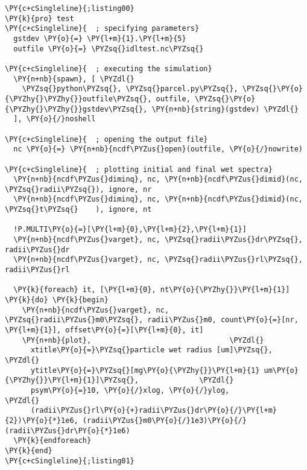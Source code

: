 \begin{Verbatim}[commandchars=\\\{\}]
\PY{c+cSingleline}{;listing00}
\PY{k}{pro} test 
\PY{c+cSingleline}{  ; specifying parameters}
  gstdev \PY{o}{=} \PY{l+m}{1}.\PY{l+m}{5}
  outfile \PY{o}{=} \PYZsq{}idltest.nc\PYZsq{}

\PY{c+cSingleline}{  ; executing the simulation}
  \PY{n+nb}{spawn}, [ \PYZdl{}
    \PYZsq{}python\PYZsq{}, \PYZsq{}parcel.py\PYZsq{}, \PYZsq{}\PY{o}{\PYZhy{}\PYZhy{}}outfile\PYZsq{}, outfile, \PYZsq{}\PY{o}{\PYZhy{}\PYZhy{}}gstdev\PYZsq{}, \PY{n+nb}{string}(gstdev) \PYZdl{}
  ], \PY{o}{/}noshell

\PY{c+cSingleline}{  ; opening the output file}
  nc \PY{o}{=} \PY{n+nb}{ncdf\PYZus{}open}(outfile, \PY{o}{/}nowrite)

\PY{c+cSingleline}{  ; plotting initial and final wet spectra}
  \PY{n+nb}{ncdf\PYZus{}diminq}, nc, \PY{n+nb}{ncdf\PYZus{}dimid}(nc, \PYZsq{}radii\PYZsq{}), ignore, nr
  \PY{n+nb}{ncdf\PYZus{}diminq}, nc, \PY{n+nb}{ncdf\PYZus{}dimid}(nc, \PYZsq{}t\PYZsq{}    ), ignore, nt

  !P.MULTI\PY{o}{=}[\PY{l+m}{0},\PY{l+m}{2},\PY{l+m}{1}]
  \PY{n+nb}{ncdf\PYZus{}varget}, nc, \PYZsq{}radii\PYZus{}dr\PYZsq{}, radii\PYZus{}dr
  \PY{n+nb}{ncdf\PYZus{}varget}, nc, \PYZsq{}radii\PYZus{}rl\PYZsq{}, radii\PYZus{}rl
 
  \PY{k}{foreach} it, [\PY{l+m}{0}, nt\PY{o}{\PYZhy{}}\PY{l+m}{1}] \PY{k}{do} \PY{k}{begin}
    \PY{n+nb}{ncdf\PYZus{}varget}, nc, \PYZsq{}radii\PYZus{}m0\PYZsq{}, radii\PYZus{}m0, count\PY{o}{=}[nr, \PY{l+m}{1}], offset\PY{o}{=}[\PY{l+m}{0}, it]
    \PY{n+nb}{plot},                                \PYZdl{}
      xtitle\PY{o}{=}\PYZsq{}particle wet radius [um]\PYZsq{}, \PYZdl{}
      ytitle\PY{o}{=}\PYZsq{}[mg\PY{o}{\PYZhy{}}\PY{l+m}{1} um\PY{o}{\PYZhy{}}\PY{l+m}{1}]\PYZsq{},              \PYZdl{}
      psym\PY{o}{=}10, \PY{o}{/}xlog, \PY{o}{/}ylog,             \PYZdl{}
      (radii\PYZus{}rl\PY{o}{+}radii\PYZus{}dr\PY{o}{/}\PY{l+m}{2})\PY{o}{*}1e6, (radii\PYZus{}m0\PY{o}{/}1e3)\PY{o}{/}(radii\PYZus{}dr\PY{o}{*}1e6)
  \PY{k}{endforeach}
\PY{k}{end}
\PY{c+cSingleline}{;listing01}
\end{Verbatim}
